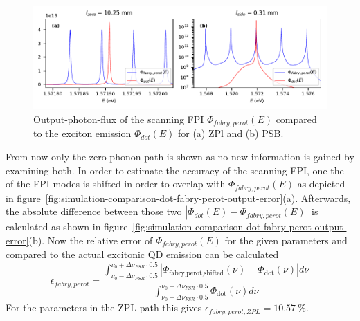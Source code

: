\begin{figure}[H]
	\centering
	\includegraphics[width=\linewidth]{figures/fabry-perot/plots/simulation-comparison-dot-fabry-perot-output}
	\caption{Output-photon-flux of the scanning FPI $\Phi_{fabry,perot}(E)$ compared to the exciton emission $\Phi_{dot}(E)$ for (a) ZPl and (b) PSB.}
	\label{fig:simulation-comparison-dot-fabry-perot-output}
\end{figure}

From now only the zero-phonon-path is shown as no new information is gained by examining both.
In order to estimate the accuracy of the scanning \ac{FPI}, one the of the \ac{FPI} modes is shifted in order to overlap with $\Phi_{fabry,perot}(E)$ as depicted in figure~\ref{fig:simulation-comparison-dot-fabry-perot-output-error}(a).
Afterwards, the absolute difference between those two $|\Phi_{dot}(E) - \Phi_{fabry,perot}(E)|$ is calculated as shown in figure~\ref{fig:simulation-comparison-dot-fabry-perot-output-error}(b).
Now the relative error of  $\Phi_{fabry,perot}(E)$  for the given parameters and compared to the actual excitonic \ac{QD} emission  can be calculated
\begin{equation}
\epsilon_{fabry,perot} = \frac{\int^{\nu_0 + \Delta \nu_{FSR} \cdot 0.5}_{\nu_0 - \Delta \nu_{FSR} \cdot 0.5} \left|\Phi_{\text{fabry,perot,shifted}}(\nu) - \Phi_{\text{dot}}(\nu)\right| d \nu }{\int^{\nu_0 + \Delta \nu_{FSR} \cdot 0.5}_{\nu_0 - \Delta \nu_{FSR} \cdot 0.5} \Phi_{\text{dot}}(\nu) d \nu}
\end{equation}
For the parameters in the \ac{ZPL} path this gives $\epsilon_{fabry,perot,ZPL}=\SI{10.57}{\percent}$.


